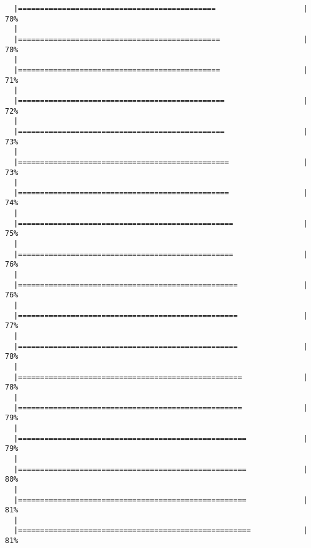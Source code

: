 \begin{knitrout}
\begin{kframe}
\begin{verbatim}
  |=============================================                    |  70%
  |                                                                       
  |==============================================                   |  70%
  |                                                                       
  |==============================================                   |  71%
  |                                                                       
  |===============================================                  |  72%
  |                                                                       
  |===============================================                  |  73%
  |                                                                       
  |================================================                 |  73%
  |                                                                       
  |================================================                 |  74%
  |                                                                       
  |=================================================                |  75%
  |                                                                       
  |=================================================                |  76%
  |                                                                       
  |==================================================               |  76%
  |                                                                       
  |==================================================               |  77%
  |                                                                       
  |==================================================               |  78%
  |                                                                       
  |===================================================              |  78%
  |                                                                       
  |===================================================              |  79%
  |                                                                       
  |====================================================             |  79%
  |                                                                       
  |====================================================             |  80%
  |                                                                       
  |====================================================             |  81%
  |                                                                       
  |=====================================================            |  81%

\end{verbatim}
\end{kframe}
\end{knitrout}
